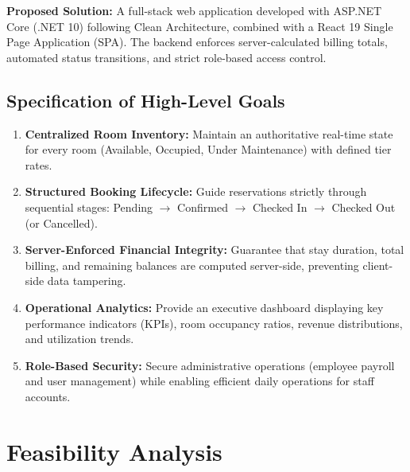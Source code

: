 \documentclass[11pt,a4paper]{article}
\begin{document}
\textbf{Proposed Solution:} A full-stack web application developed with ASP.NET Core (.NET 10) following Clean Architecture, combined with a React 19 Single Page Application (SPA). The backend enforces server-calculated billing totals, automated status transitions, and strict role-based access control.

\subsection{Specification of High-Level Goals}
\begin{enumerate}[leftmargin=*]
  \item \textbf{Centralized Room Inventory:} Maintain an authoritative real-time state for every room (Available, Occupied, Under Maintenance) with defined tier rates.
  \item \textbf{Structured Booking Lifecycle:} Guide reservations strictly through sequential stages: Pending $\rightarrow$ Confirmed $\rightarrow$ Checked In $\rightarrow$ Checked Out (or Cancelled).
  \item \textbf{Server-Enforced Financial Integrity:} Guarantee that stay duration, total billing, and remaining balances are computed server-side, preventing client-side data tampering.
  \item \textbf{Operational Analytics:} Provide an executive dashboard displaying key performance indicators (KPIs), room occupancy ratios, revenue distributions, and utilization trends.
  \item \textbf{Role-Based Security:} Secure administrative operations (employee payroll and user management) while enabling efficient daily operations for staff accounts.
\end{enumerate}

\section{Feasibility Analysis}
\end{document}
